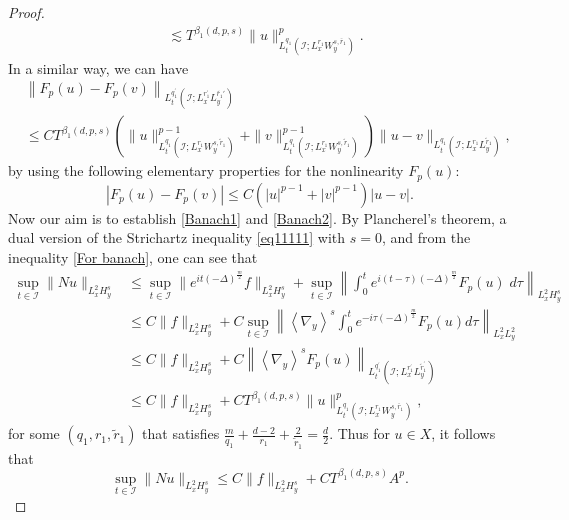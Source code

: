 \documentclass[a4paper,11pt, reqno]{amsart}
\theoremstyle{definition}
\theoremstyle{remark}
\numberwithin{equation}{section}
\begin{document}
\begin{proof}
\begin{align}
			&\lesssim  T^{\beta_1(d, p, s)}  \|u\|_{L_t^{q_1}\left(\mathcal{I} ; L_x^{r_1} W_y^{s, \bar{r}_1}\right)}^p.
		\end{align}
		In a similar way, we can have
		\begin{align}\label{To prove 2}\nonumber
			& \left\|F_p(u)-F_p(v)\right\|_{L_t^{q_1^{\prime}}\left(\mathcal{I}; L_x^{r_1^{\prime}} L_y^{\tilde{r_1}'}\right)} \\
			& \leq C T^{\beta_1(d, p, s)}\left(\|u\|_{L_t^{q_1}\left(\mathcal{I}; L_x^{r_1} W_y^{s, \tilde{r}_1}\right)}^{p-1}+\|v\|_{L_t^{q_1}\left(\mathcal{I} ; L_x^{r_1} W_y^{s, \tilde{r}_1}\right)}^{p-1}\right)\|u-v\|_{L_t^{q_1}\left(\mathcal{I}; L_x^{r_1} L_y^{\tilde{r}_1}\right)},
		\end{align} 
        by using the following elementary properties for the nonlinearity $F_p(u):$
        \begin{equation}
            |F_p(u)-F_p(v)| \leq C (|u|^{p-1}+|v|^{p-1}) |u-v|.
        \end{equation}
		Now our aim is to establish \eqref{Banach1} and \eqref{Banach2}. 
		By Plancherel's theorem, a dual version of  the Strichartz inequality \eqref{eq11111} with $s=0$, and from the inequality  \eqref{For banach}, one can see that 
		$$
		\begin{aligned}
			\sup _{t \in \mathcal{I}}\|Nu \|_{L_x^2 H_y^s} & \leq 
			\sup _{t \in \mathcal{I}} 	\|	e^{i t (-\Delta)^{\frac{m}{2}}} f \|_{L_x^2 H_y^s} +	\sup _{t \in \mathcal{I}}\left \| \int_0^t e^{i(t-\tau) (-\Delta)^{\frac{m}{2}}} F_p(u)\; d \tau \right\|_{L_x^2 H_y^s}\\ 		
			& \leq C\|f\|_{L_x^2 H_y^s}+C	\sup _{t \in \mathcal{I}} \left\|\left\langle\nabla_y\right\rangle^s \int_0^t e^{-i \tau (-\Delta)^{\frac{m}{2}}} F_p(u) d \tau\right\|_{L_x^2 L_y^2} \\
			& \leq C\|f\|_{L_x^2 H_y^s}+C\left\|\left\langle\nabla_y\right\rangle^s F_p(u)\right\|_{L_t^{q_1^{\prime}}\left(\mathcal{I} ; L_x^{r_1^{\prime}} L_y^{\tilde{r}_1^{\prime}}\right)}\\
			&	\leq C\|f\|_{L_x^2 H_y^s}+C	T^{\beta_1(d, p, s)}  \|u\|_{L_t^{q_1}\left(\mathcal{I} ; L_x^{r_1} W_y^{s, \bar{r}_1}\right)}^p,
		\end{aligned}
		$$
		for some $\left(q_1, r_1, \widetilde{r}_1\right) $  that satisfies 		$\frac{{{m}}}{q_1}+\frac{d-2}{r_1}+\frac{2}{\widetilde{r}_1}=\frac{d}{2}.$  Thus for $u \in X$, it follows that
		\begin{equation}\label{final1}
		    \sup _{t \in \mathcal{I}}\|Nu \|_{L_x^2 H_y^s} 	\leq C\|f\|_{L_x^2 H_y^s}+C	T^{\beta_1(d, p, s)} A^p.
		\end{equation}	 
		

\end{proof}
\end{document}
